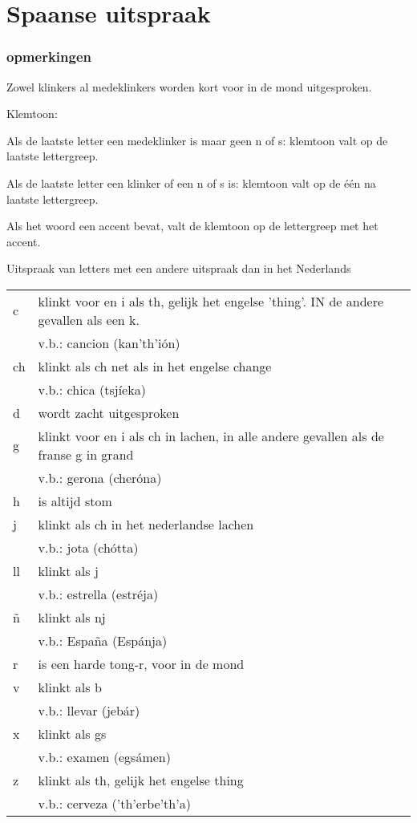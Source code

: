 \section{Spaanse uitspraak}
\subsubsection*{opmerkingen}
\vspace{-12pt}
\begin{compactenum}
\item Zowel klinkers al medeklinkers worden kort voor in de mond uitgesproken.
\item Klemtoon:
\begin{compactenum}
\item Als de laatste letter een medeklinker is maar geen n of s: klemtoon valt op de laatste lettergreep.
\item Als de laatste letter een klinker of een n of s is: klemtoon valt op de \'e\'en na laatste lettergreep.
\item Als het woord een accent bevat, valt de klemtoon op de lettergreep met het accent.
\end{compactenum}
\end{compactenum}

Uitspraak van letters met een andere uitspraak dan in het Nederlands\\
\begin{tabularx}{1.0\textwidth}{l l}
c & klinkt voor en i als th, gelijk het engelse 'thing'. IN de andere gevallen als een k.\\
 & v.b.: cancion (kan'th'i\'on)\\
ch & klinkt als ch net als in het engelse change\\
 & v.b.: chica (tsj\'ieka)\\
d & wordt zacht uitgesproken\\
g & klinkt voor en i als ch in lachen, in alle andere gevallen als de franse g in grand\\
 & v.b.: gerona (cher\'ona)\\
h & is altijd stom\\
j & klinkt als ch in het nederlandse lachen\\
 & v.b.: jota (ch\'otta)\\
ll & klinkt als j\\
 & v.b.: estrella (estr\'eja)\\
\~{n} & klinkt als nj\\
 & v.b.: Espa\~na (Esp\'anja)\\
r & is een harde tong-r, voor in de mond\\
v & klinkt als b\\
 & v.b.: llevar (jeb\'ar)\\
x & klinkt als gs\\
 & v.b.: examen (egs\'amen)\\
z & klinkt als th, gelijk het engelse thing\\
 & v.b.: cerveza ('th'erbe'th'a)\\
\end{tabularx}

